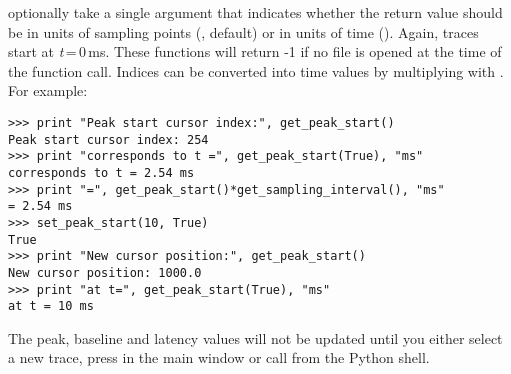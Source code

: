 optionally take a single argument that indicates whether the return value should be in units of sampling points (, default) or in units of time (). Again, traces start at \textit{t}\,=\,0\,ms. These functions will return -1 if no file is opened at the time of the function call. Indices can be converted into time values by multiplying with . For example:
\begin{lstlisting}
>>> print "Peak start cursor index:", get_peak_start()
Peak start cursor index: 254
>>> print "corresponds to t =", get_peak_start(True), "ms"
corresponds to t = 2.54 ms
>>> print "=", get_peak_start()*get_sampling_interval(), "ms"
= 2.54 ms
>>> set_peak_start(10, True)
True
>>> print "New cursor position:", get_peak_start()
New cursor position: 1000.0
>>> print "at t=", get_peak_start(True), "ms"
at t = 10 ms
\end{lstlisting}
The peak, baseline and latency values will not be updated until you either select a new trace, press  in the main window or call  from the Python shell.

